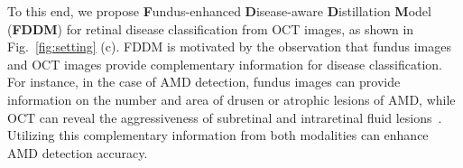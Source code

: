 \documentclass[runningheads]{llncs}
\newcommand{\wdai}[1]{{\color[rgb]{0.9,0.1,0.1}{#1}}}
\newcommand{\xmli}[1]{{\color{red}{[XM: #1]}}}
\begin{document}



To this end, we propose \textbf{F}undus-enhanced \textbf{D}isease-aware \textbf{D}istillation \textbf{M}odel (\textbf{FDDM}) for retinal disease classification from OCT images, as shown in Fig.~\ref{fig:setting} (c). 
FDDM is motivated by the observation that fundus images and OCT images provide complementary information for disease classification. For instance, in the case of AMD detection, fundus images can provide information on the number and area of drusen or atrophic lesions of AMD, while OCT can reveal the aggressiveness of subretinal and intraretinal fluid lesions~\cite{yoo2019possibility}. Utilizing this complementary information from both modalities can enhance AMD detection accuracy. 
\end{document}
